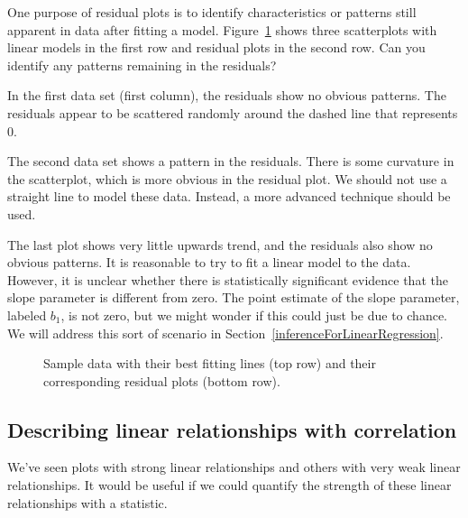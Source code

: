 \begin{examplewrap}
\begin{nexample}{One purpose of residual plots is to identify
    characteristics or patterns still apparent in data after
    fitting a model.
    Figure~\ref{sampleLinesAndResPlots} shows three scatterplots
    with linear models in the first row and residual plots in the
    second row.
    Can you identify any patterns remaining in the residuals?}

  In the first data set (first column), the residuals show
  no obvious patterns.
  The residuals appear to be scattered randomly around the
  dashed line that represents 0.

  The second data set shows a pattern in the residuals.
  There is some curvature in the scatterplot, which is more
  obvious in the residual plot.
  We should not use a straight line to model these data.
  Instead, a more advanced technique should be used.

  The last plot shows very little upwards trend, and the
  residuals also show no obvious patterns.
  It is reasonable to try to fit a linear model to the data.
  However, it is unclear whether there is statistically
  significant evidence that the slope parameter is different
  from zero.
  The point estimate of the slope parameter, labeled $b_1$,
  is not zero, but we might wonder if this could just be due
  to chance.
  We will address this sort of scenario in
  Section~\ref{inferenceForLinearRegression}.
\end{nexample}
\end{examplewrap}

\begin{figure}
   \centering
   \caption{Sample data with their best fitting lines (top row) and their corresponding residual plots (bottom row).}
   \label{sampleLinesAndResPlots}
\end{figure}



\subsection{Describing linear relationships with correlation}


\noindent%
We've seen plots with strong linear relationships and
others with very weak linear relationships.
It would be useful if we could quantify the strength of these
linear relationships with a statistic.

